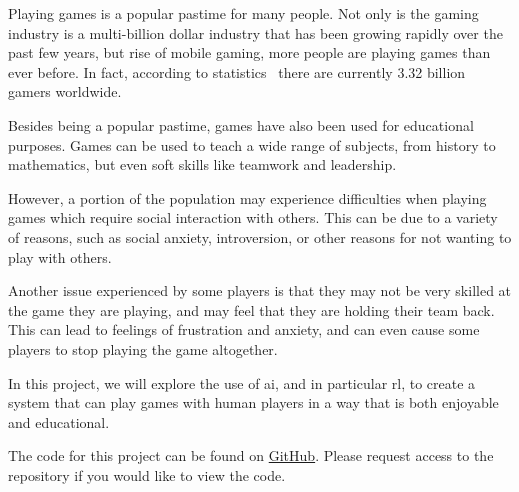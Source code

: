 Playing games is a popular pastime for many people. Not only is the gaming
industry is a multi-billion dollar industry that has been growing rapidly over
the past few years, but rise of mobile gaming, more people are playing games
than ever before. In fact, according to statistics~\cite{gamer-count} there are
currently 3.32 billion gamers worldwide.

Besides being a popular pastime, games have also been used for educational
purposes. Games can be used to teach a wide range of subjects, from history to
mathematics, but even soft skills like teamwork and leadership.

However, a portion of the population may experience difficulties when playing
games which require social interaction with others. This can be due to a
variety of reasons, such as social anxiety, introversion, or other reasons for
not wanting to play with others.

Another issue experienced by some players is that they may not be very skilled
at the game they are playing, and may feel that they are holding their team
back. This can lead to feelings of frustration and anxiety, and can even cause
some players to stop playing the game altogether.

In this project, we will explore the use of \gls{ai}, and in particular
\gls{rl}, to create a system that can play games with human players in a way
that is both enjoyable and educational.

The code for this project can be found on \href{https://github.com/TimoRasenbergEdu/design-challenge}{GitHub}.
Please request access to the repository if you would like to view the code. 